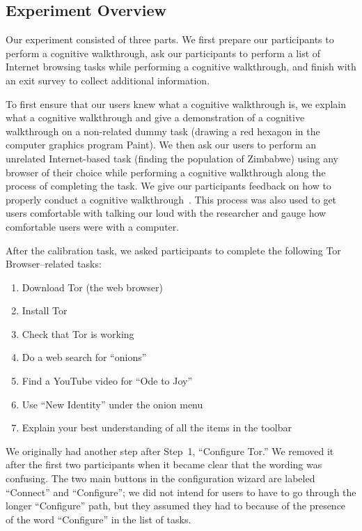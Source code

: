 \documentclass[letterpaper,twocolumn,11pt]{article}
\begin{document}
\subsection{Experiment Overview}
\indent \indent Our experiment consisted of three parts. We first prepare our participants to perform a 
cognitive walkthrough, ask our participants to perform a list of Internet browsing 
tasks while performing a cognitive walkthrough, and finish with an exit survey to collect 
additional information. 

To first ensure that our users knew what a cognitive walkthrough is, we explain what a cognitive
walkthrough and give a demonstration of a cognitive walkthrough on a non-related dummy task 
(drawing a red hexagon in the computer graphics program Paint). We then ask our users to perform
an unrelated Internet-based task (finding the population of Zimbabwe) using any browser of their choice
while performing a cognitive walkthrough along the process of completing the task. We give our 
participants feedback on how to properly conduct a cognitive walkthrough~\cite{wharton1994cognitive}.
This process was also used to get users comfortable with talking our loud with the researcher and gauge 
how comfortable users were with a computer.

After the calibration task, we asked participants to complete
the following Tor Browser--related tasks: 

\begin{enumerate} \itemsep1pt \parskip0pt 
\item Download Tor (the web browser)
\item Install Tor
\item Check that Tor is working
\item Do a web search for ``onions''
\item Find a YouTube video for ``Ode to Joy''
\item Use ``New Identity'' under the onion menu
\item Explain your best understanding of all the items in the toolbar
\end{enumerate}

We originally had another step after Step~1, ``Configure Tor.''
We removed it after the first two participants
when it became clear that the wording was confusing.
The two main buttons in the configuration wizard are labeled
``Connect'' and ``Configure''; we did not intend for users
to have to go through the longer ``Configure'' path,
but they assumed they had to because of the presence
of the word ``Configure'' in the list of tasks.
\end{document}
